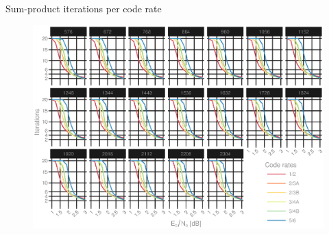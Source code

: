 \documentclass{beamer}
\begin{document}
\begin{darkframes}
  \begin{frame}{Sum-product iterations per code rate}
    \begin{figure}[h]
      \centering
      \vspace{-2mm}%
      \hspace{-6mm}%
      \includegraphics[width=1.05\textwidth]{figures/iters_vs_SNR_per_rate.eps}
    \end{figure}
  \end{frame}

\end{darkframes}
\end{document}
